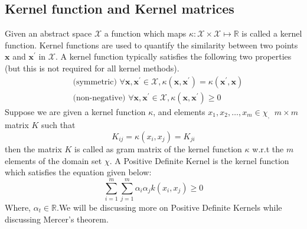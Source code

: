 \documentclass[../main.tex]{subfiles}
\begin{document}
    \subsection{Kernel function and Kernel matrices}
Given an abstract space $\mathcal{X}$ a function which maps $\kappa: \mathcal{X} \times \mathcal{X} \mapsto \mathbb{R}$ is called a kernel function. Kernel functions are used to quantify the similarity between two points $\mathbf{x}$ and $\mathbf{x}^{\prime}$ in $\mathcal{X}$.
A kernel function typically satisfies the following two properties (but this is not required for all kernel methods). 
$$
\begin{aligned}
&\text { (symmetric) } \forall \mathbf{x}, \mathbf{x}^{\prime} \in \mathcal{X}, \kappa\left(\mathbf{x}, \mathbf{x}^{\prime}\right)=\kappa\left(\mathbf{x}^{\prime}, \mathbf{x}\right) \\
&\text { (non-negative) } \forall \mathbf{x}, \mathbf{x}^{\prime} \in \mathcal{X}, \kappa\left(\mathbf{x}, \mathbf{x}^{\prime}\right) \geq 0
\end{aligned}
$$
Suppose we are given a kernel function $\kappa$, and elements $x_{1}, x_{2}, \ldots, x_{m} \in \chi_{\text {, }}$ $m \times m$ matrix $K$ such that
$$
K_{i j}=\kappa\left(x_{i}, x_{j}\right)=K_{j i}
$$
then the matrix $K$ is called as gram matrix of the kernel function $\kappa$ w.r.t the $m$ elements of the domain set $\chi$.
A Positive Definite Kernel is the kernel function which satisfies the equation given below:
$$
\sum_{i=1}^{m} \sum_{j=1}^{m} \alpha_{i} \alpha_{j} k\left(x_{i}, x_{j}\right) \geq 0
$$
Where, $\alpha_{t} \in \mathbb{R}$.We will be discussing more on Positive Definite Kernels while discussing Mercer's theorem.
    
\end{document}
